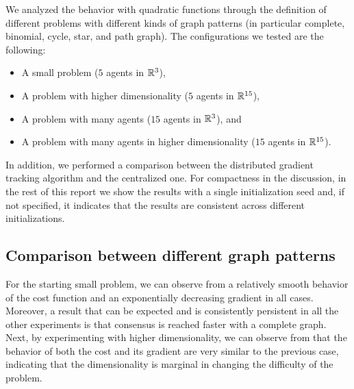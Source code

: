 \documentclass[a4paper,11pt,oneside]{book}
\begin{document}
We analyzed the behavior with quadratic functions through the definition of different problems with different kinds of graph patterns (in particular complete, binomial, cycle, star, and path graph). The configurations we tested are the following:
\begin{itemize}
      \item A small problem ($5$ agents in ${\mathbb{R}}^3$),
      \item A problem with higher dimensionality ($5$ agents in ${\mathbb{R}}^{15}$),
      \item A problem with many agents ($15$ agents in ${\mathbb{R}}^3$), and
      \item A problem with many agents in higher dimensionality ($15$ agents in ${\mathbb{R}}^{15}$).
\end{itemize}
In addition, we performed a comparison between the distributed gradient tracking algorithm and the centralized one. For compactness in the discussion, in the rest of this report we show the results with a single initialization seed and, if not specified, it indicates that the results are consistent across different initializations.


\subsection{Comparison between different graph patterns}

For the starting small problem, we can observe from  a relatively smooth behavior of the cost function and an exponentially decreasing gradient in all cases. Moreover, a result that can be expected and is consistently persistent in all the other experiments is that consensus is reached faster with a complete graph. Next, by experimenting with higher dimensionality, we can observe from  that the behavior of both the cost and its gradient are very similar to the previous case, indicating that the dimensionality is marginal in changing the difficulty of the problem. 
\end{document}
